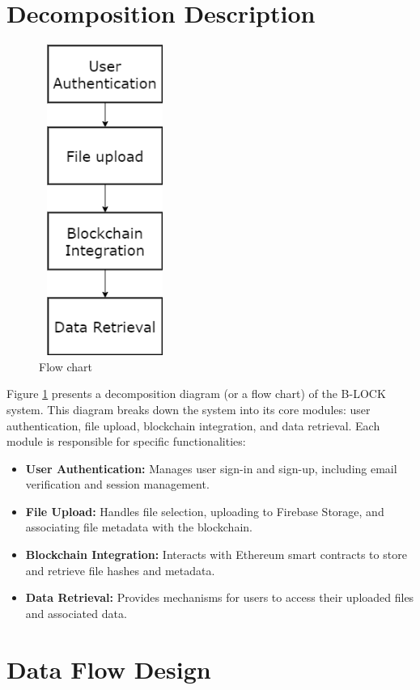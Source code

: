 \documentclass[12pt,a4paper]{report}
\begin{document}
\section{Decomposition Description}
\begin{figure}[hbtp]
\centering
\includegraphics[width=1.7in,height=4in]{./pic/flowchart.png}
\caption{Flow chart}
\label{fig:flowchart}
\end{figure}
Figure \ref{fig:flowchart} presents a decomposition diagram (or a flow chart) of the B-LOCK system. This diagram breaks down the system into its core modules: user authentication, file upload, blockchain integration, and data retrieval. Each module is responsible for specific functionalities:
\begin{itemize}
   \item \textbf{User Authentication:} Manages user sign-in and sign-up, including email verification and session management.
   \item \textbf{File Upload:} Handles file selection, uploading to Firebase Storage, and associating file metadata with the blockchain.
   \item \textbf{Blockchain Integration:} Interacts with Ethereum smart contracts to store and retrieve file hashes and metadata.
   \item \textbf{Data Retrieval:} Provides mechanisms for users to access their uploaded files and associated data.
\end{itemize}


\section{Data Flow Design}
\end{document}
